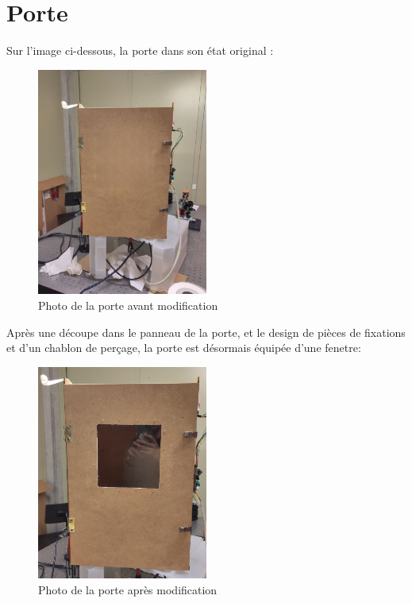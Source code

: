 \section{Porte}
Sur l'image ci-dessous, la porte dans son état original :
\begin{figure}[H]
    \centering
    \includegraphics[width=0.5\textwidth]{assets/figures/ameliorations/porte_sans_fenetre.png}
    \caption{Photo de la porte avant modification}\label{photo porte}
\end{figure}

\newpage
Après une découpe dans le panneau de la porte, et le design de pièces de fixations et d'un chablon de perçage,
la porte est désormais équipée d'une fenetre:
\begin{figure}[H]
    \centering
    \includegraphics[width=0.5\textwidth]{assets/figures/ameliorations/porte_avec_fenetre.jpg}
    \caption{Photo de la porte après modification}\label{photo porte fenetre}
\end{figure}

